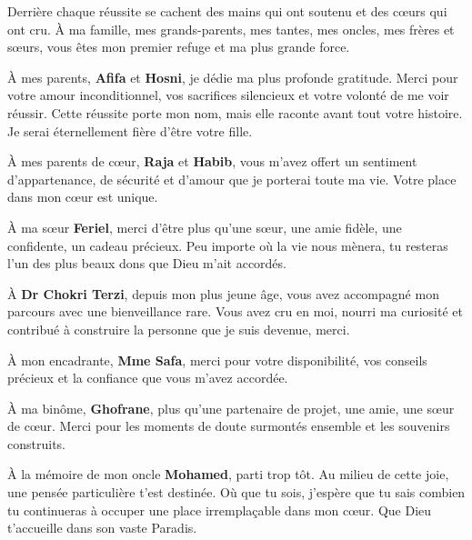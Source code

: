 \documentclass[12pt,a4paper]{report}
\begin{document}
\thispagestyle{empty}
\begin{center}
\itshape

Derrière chaque réussite se cachent des mains qui ont soutenu et des cœurs qui ont cru. À ma famille, mes grands-parents, mes tantes, mes oncles, mes frères et sœurs, vous êtes mon premier refuge et ma plus grande force. 

\vspace{0.3cm}

À mes parents, \textbf{Afifa} et \textbf{Hosni}, je dédie ma plus profonde gratitude. Merci pour votre amour inconditionnel, vos sacrifices silencieux et votre volonté de me voir réussir. Cette réussite porte mon nom, mais elle raconte avant tout votre histoire. Je serai éternellement fière d’être votre fille.

\vspace{0.3cm}

À mes parents de cœur, \textbf{Raja} et \textbf{Habib}, vous m’avez offert un sentiment d’appartenance, de sécurité et d’amour que je porterai toute ma vie. Votre place dans mon cœur est unique.

\vspace{0.3cm}

À ma sœur \textbf{Feriel}, merci d'être plus qu’une sœur, une amie fidèle, une confidente, un cadeau précieux. Peu importe où la vie nous mènera, tu resteras l’un des plus beaux dons que Dieu m’ait accordés.

\vspace{0.3cm}

À \textbf{Dr Chokri Terzi}, depuis mon plus jeune âge, vous avez accompagné mon parcours avec une bienveillance rare. Vous avez cru en moi, nourri ma curiosité et contribué à construire la personne que je suis devenue, merci.

\vspace{0.3cm}

À mon encadrante, \textbf{Mme Safa}, merci pour votre disponibilité, vos conseils précieux et la confiance que vous m’avez accordée.

\vspace{0.3cm}

À ma binôme, \textbf{Ghofrane}, plus qu’une partenaire de projet, une amie, une sœur de cœur. Merci pour les moments de doute surmontés ensemble et les souvenirs construits.

\vspace{0.3cm}

À la mémoire de mon oncle \textbf{Mohamed}, parti trop tôt. Au milieu de cette joie, une pensée particulière t’est destinée. Où que tu sois, j’espère que tu sais combien tu continueras à occuper une place irremplaçable dans mon cœur. Que Dieu t’accueille dans son vaste Paradis.


\end{center}
\end{document}
